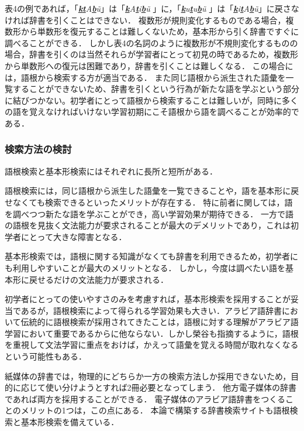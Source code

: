\documentclass[technicalreport]{ieicej}
\begin{document}
表4の例であれば，「\textit{\underline{\textbf{k}}\underline{\textbf{t}}A\underline{\textbf{b}}\~u}」は「\textit{\underline{\textbf{k}}A\underline{\textbf{t}}i\underline{\textbf{b}}\~u} 」に，「\textit{\underline{\textbf{k}}u\underline{\textbf{t}}u\underline{\textbf{b}}\~u} 」は「\textit{\underline{\textbf{k}}i\underline{\textbf{t}}A\underline{\textbf{b}}\~u}」に戻さなければ辞書を引くことはできない．
複数形が規則変化するものである場合，複数形から単数形を復元することは難しくないため，基本形から引く辞書ですぐに調べることができる．
しかし表4の名詞のように複数形が不規則変化するものの場合，辞書を引くのは当然それらが学習者にとって初見の時であるため，複数形から単数形への復元は困難であり，辞書を引くことは難しくなる．
この場合には，語根から検索する方が適当である．
また同じ語根から派生された語彙を一覧することができないため、辞書を引くという行為が新たな語を学ぶという部分に結びつかない。初学者にとって語根から検索することは難しいが，同時に多くの語を覚えなければいけない学習初期にこそ語根から語を調べることが効率的である．

\subsubsection{検索方法の検討}
語根検索と基本形検索にはそれぞれに長所と短所がある．

語根検索には，同じ語根から派生した語彙を一覧できることや，語を基本形に戻せなくても検索できるといったメリットが存在する．
特に前者に関しては，語を調べつつ新たな語を学ぶことができ，高い学習効果が期待できる．
一方で語の語根を見抜く文法能力が要求されることが最大のデメリットであり，これは初学者にとって大きな障害となる．

基本形検索では，語根に関する知識がなくても辞書を利用できるため，初学者にも利用しやすいことが最大のメリットとなる．
しかし，今度は調べたい語を基本形に戻せるだけの文法能力が要求される．

初学者にとっての使いやすさのみを考慮すれば，基本形検索を採用することが妥当であるが，語根検索によって得られる学習効果も大きい．アラビア語辞書において伝統的に語根検索が採用されてきたことは，語根に対する理解がアラビア語学習において重要であるからに他ならない．しかし榮谷\cite{sakaedani2008}も指摘するように，語根を重視して文法学習に重点をおけば，かえって語彙を覚える時間が取れなくなるという可能性もある．

紙媒体の辞書では，物理的にどちらか一方の検索方法しか採用できないため，目的に応じて使い分けようとすれば2冊必要となってしまう．
他方電子媒体の辞書であれば両方を採用することができる．
電子媒体のアラビア語辞書をつくることのメリットの1つは，この点にある．
本論で構築する辞書検索サイトも語根検索と基本形検索を備えている．
\end{document}
